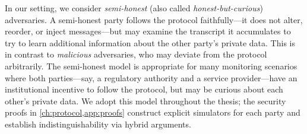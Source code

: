 In our setting, we consider \emph{semi-honest} (also called \emph{honest-but-curious}) adversaries. A semi-honest party follows the protocol faithfully---it does not alter, reorder, or inject messages---but may examine the transcript it accumulates to try to learn additional information about the other party's private data. This is in contrast to \emph{malicious} adversaries, who may deviate from the protocol arbitrarily. The semi-honest model is appropriate for many monitoring scenarios where both parties---say, a regulatory authority and a service provider---have an institutional incentive to follow the protocol, but may be curious about each other's private data. We adopt this model throughout the thesis; the security proofs in \cref{ch:protocol,app:proofs} construct explicit simulators for each party and establish indistinguishability via hybrid arguments.
